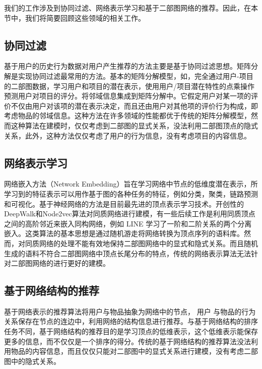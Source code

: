 \documentclass[lang=cn,11pt]{elegantpaper}
\begin{document}
我们的工作涉及到协同过滤、网络表示学习和基于二部图网络的推荐。因此，在本节中，我们将简要回顾这些领域的相关工作。

\subsection{协同过滤}

基于用户的历史行为数据对用户产生推荐的方法主要是基于协同过滤思想\cite{Su2009}。矩阵分解是实现协同过滤最常用的方法。基本的矩阵分解模型，如\cite{Salakhutdinov2007,Koren2009}，完全通过用户-项目的二部图数据，学习用户和项目的潜在表示，使用用户/项目潜在特性的点乘操作预测用户对项目的评分。\cite{Koren2008}将邻域信息集成到矩阵分解中。它假定用户对某一项的评价不仅由用户对该项的潜在表示决定，而且还由用户对其他项的评价行为构成，即考虑物品的邻域信息。这种方法在许多领域的性能都优于传统的矩阵分解模型，然而这种算法在建模时，仅仅考虑到二部图的显式关系，没法利用二部图顶点的隐式关系，此外，这种方法仅仅考虑了用户的行为信息，没有考虑项目的内容信息。

\subsection{网络表示学习}

网络嵌入方法（Network Embedding）旨在学习网络中节点的低维度潜在表示，所学习到的特征表示可以用作基于图的各种任务的特征，例如分类，聚类，链路预测和可视化。基于神经网络的方法是目前最先进的顶点表示学习技术。开创性的DeepWalk\cite{Perozzi2014}和Node2vec\cite{Grover2016}算法对同质网络进行建模，有一些后续工作是利用同质顶点之间的高阶邻近来嵌入同构网络，例如 LINE \cite{Tang2015}学习了一阶和二阶关系的两个分离嵌入。这类算法的基本思想是通过随机游走将网络转换为顶点序列的语料库。然而，对同质网络的处理不能有效地保持二部图网络中的显式和隐式关系。而且随机生成的语料不符合二部图网络中顶点长尾分布的特点，传统的网络表示算法无法针对二部图网络的进行更好的建模。

\subsection{基于网络结构的推荐}

基于网络表示的推荐算法将用户与物品抽象为网络中的节点， 用户
与物品的行为关系保存在节点的连边中，利用网络的结构信息进行推荐\cite{Liu2009,Pongnumkul2018}。与基于网络结构的排序任务不同，基于网络结构的推荐目的是学习顶点的低维表示，这个低维表示能保存更多的信息，而不仅仅是一个排序的得分。传统的基于网络结构的推荐算法没法利用物品的内容信息，而且仅仅只能对二部图中的显式关系进行建模，没有考虑二部图中的隐式关系。
\end{document}
